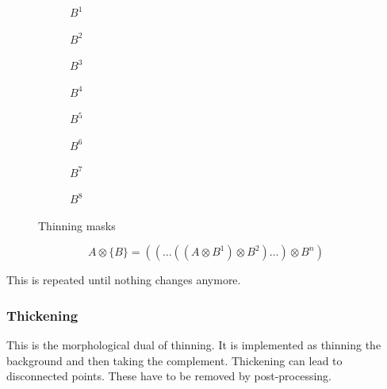 \begin{figure}[h]
	\centering
	\begin{subfigure}[b]{0.1\textwidth}
		\centering
		\caption{$B^1$}
	\end{subfigure}
	\begin{subfigure}[b]{0.1\textwidth}
		\centering
		\caption{$B^2$}
	\end{subfigure}
	\begin{subfigure}[b]{0.1\textwidth}
		\centering
		\caption{$B^3$}
	\end{subfigure}
	\begin{subfigure}[b]{0.1\textwidth}
		\centering
		\caption{$B^4$}
	\end{subfigure}
	\begin{subfigure}[b]{0.1\textwidth}
		\centering
		\caption{$B^5$}
	\end{subfigure}
	\begin{subfigure}[b]{0.1\textwidth}
		\centering
		\caption{$B^6$}
	\end{subfigure}
	\begin{subfigure}[b]{0.1\textwidth}
		\centering
		\caption{$B^7$}
	\end{subfigure}
	\begin{subfigure}[b]{0.1\textwidth}
		\centering
		\caption{$B^8$}
	\end{subfigure}
	\caption{Thinning masks}
\end{figure}
	\[
		A \otimes  \{B\} = ((\ldots((A \otimes B^{1}) \otimes B^{2})\ldots) \otimes B^{n})
	\]

This is repeated until nothing changes anymore.

\subsubsection{Thickening}
This is the morphological dual of thinning. It is implemented as thinning the background and then taking the complement.
Thickening can lead to disconnected points. These have to be removed by post-processing.

